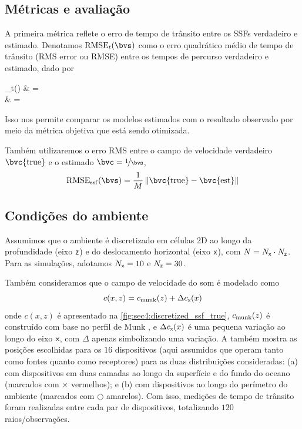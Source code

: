 \subsection{Métricas e avaliação}

A primeira métrica reflete o erro de tempo de trânsito entre os SSFs verdadeiro e estimado. Denotamos $\rmse_{t}(\bvs)$ como o erro quadrático médio de tempo de trânsito (RMS error ou RMSE) entre os tempos de percurso verdadeiro e estimado, dado por
\begin{equations}
	\rmse_{t}(\bvs)
	& =  \\
	& = 
	\label{eq:sec3:rmse_t}
\end{equations}

Isso nos permite comparar os modelos estimados com o resultado observado por meio da métrica objetiva que está sendo otimizada.

Também utilizaremos o erro RMS entre o campo de velocidade verdadeiro $\bvc{\true}$ e o estimado $\bvc = \nfrac{1}{\bvs}$,
\begin{equation}
	\rmse_{\ssf}(\bvs) = \frac{1}{M} \norm{\bvc{\true} - \bvc{\est}}
	\label{eq:sec3:rmse_ssf}
\end{equation}
%


\subsection{Condições do ambiente}

Assumimos que o ambiente é discretizado em células 2D ao longo da profundidade (eixo ${\textsf{z}}$) e do deslocamento horizontal (eixo ${\textsf{x}}$), com $N = N_{{\textsf{x}}} \cdot N_{{\textsf{z}}}$. Para as simulações, adotamos $N_{{\textsf{x}}} = 10$ e $N_{{\textsf{z}}} = 30$.

Também consideramos que o campo de velocidade do som é modelado como
\begin{equation}
	c(x,z) = c_{\operatorname{munk}}(z) + \Delta c_{{\textsf{x}}}(x)
\end{equation}
onde $c(x,z)$ é apresentado na \cref{fig:sec4:discretized_ssf_true}, $c_{\operatorname{munk}}(z)$ é construído com base no perfil de Munk \cite{munk_sound_1974}, e $\Delta c_{{\textsf{x}}}(x)$ é uma pequena variação ao longo do eixo ${\textsf{x}}$, com $\Delta$ apenas simbolizando uma variação. A  também mostra as posições escolhidas para os $16$ dispositivos (aqui assumidos que operam tanto como fontes quanto como receptores) para as duas distribuições consideradas: (a) com dispositivos em duas camadas ao longo da superfície e do fundo do oceano (marcados com $\times$ vermelhos); e (b) com dispositivos ao longo do perímetro do ambiente (marcados com $\bigcirc$ amarelos). Com isso, medições de tempo de trânsito foram realizadas entre cada par de dispositivos, totalizando $120$ raios/observações.

